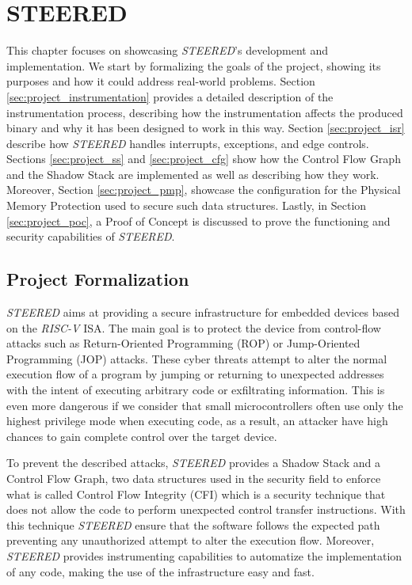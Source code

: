 \chapter{STEERED}
\label{cha:project}

This chapter focuses on showcasing \textit{STEERED}'s development and implementation.
We start by formalizing the goals of the project, showing its purposes and how it
could address real-world problems. Section \ref{sec:project_instrumentation}
provides a detailed description of the instrumentation process, describing how the
instrumentation affects the produced binary and why it has been designed to work
in this way. Section \ref{sec:project_isr} describe how \textit{STEERED} handles
interrupts, exceptions, and edge controls. Sections \ref{sec:project_ss} and
\ref{sec:project_cfg} show how the Control Flow Graph and the Shadow Stack are
implemented as well as describing how they work. Moreover, Section
\ref{sec:project_pmp}, showcase the configuration for the Physical Memory Protection
used to secure such data structures. Lastly, in Section \ref{sec:project_poc}, a
Proof of Concept is discussed to prove the functioning and security capabilities
of \textit{STEERED}.

\section{Project Formalization}
\label{sec:project_formalization}

\textit{STEERED} aims at providing a secure infrastructure for embedded devices based
on the \textit{RISC-V} ISA. The main goal is to protect the device from control-flow
attacks such as Return-Oriented Programming (ROP) or Jump-Oriented Programming (JOP)
attacks. These cyber threats attempt to alter the normal execution flow of a
program by jumping or returning to unexpected addresses with the intent of
executing arbitrary code or exfiltrating information. This is even more dangerous
if we consider that small microcontrollers often use only the highest privilege mode
when executing code, as a result, an attacker have high chances to gain complete
control over the target device.

To prevent the described attacks, \textit{STEERED} provides a Shadow Stack and a
Control Flow Graph, two data structures used in the security field to enforce
what is called Control Flow Integrity (CFI) which is a security technique that
does not allow the code to perform unexpected control transfer instructions. With
this technique \textit{STEERED} ensure that the software follows the expected
path preventing any unauthorized attempt to alter the execution flow. Moreover,
\textit{STEERED} provides instrumenting capabilities to automatize the implementation
of any code, making the use of the infrastructure easy and fast.

